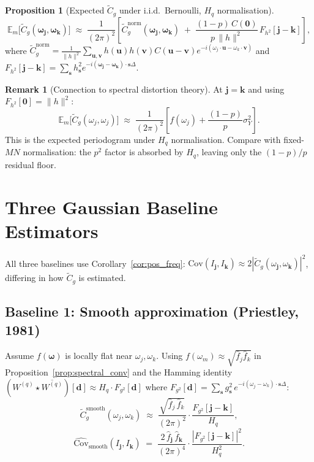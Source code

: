 \documentclass[12pt]{article}
\theoremstyle{definition}
\newtheorem{proposition}{Proposition}
\newtheorem{remark}{Remark}
\begin{document}
\begin{proposition}[Expected $\tilde{C}_g$ under i.i.d.\ Bernoulli, $H_q$ normalisation]
\label{prop:mask_bernoulli}
\[
\boxed{
  \mathbb{E}_m\!\bigl[\tilde{C}_g(\boldsymbol{\omega}_{\mathbf{j}},\boldsymbol{\omega}_{\mathbf{k}})\bigr]
  \;\approx\;
  \frac{1}{(2\pi)^2}\left[
    \tilde{C}_g^{\mathrm{norm}}(\boldsymbol{\omega}_{\mathbf{j}},\boldsymbol{\omega}_{\mathbf{k}})
  \;+\; \frac{(1-p)\,C(\mathbf{0})}{p\,\|h\|^2}\,F_{h^2}[\mathbf{j}-\mathbf{k}]
  \right],
}
\]
where $\tilde{C}_g^{\mathrm{norm}} = \frac{1}{\|h\|^2}\sum_{\mathbf{u},\mathbf{v}}h(\mathbf{u})h(\mathbf{v})C(\mathbf{u}-\mathbf{v})e^{-i(\omega_j \cdot \mathbf{u} - \omega_k \cdot \mathbf{v})}$
and $F_{h^2}[\mathbf{j}-\mathbf{k}] = \sum_{\mathbf{s}}h_{\mathbf{s}}^2 e^{-i(\boldsymbol{\omega}_{\mathbf{j}}-\boldsymbol{\omega}_{\mathbf{k}})\cdot\mathbf{s}\Delta}$.
\end{proposition}

\begin{remark}[Connection to spectral distortion theory]
At $\mathbf{j}=\mathbf{k}$ and using $F_{h^2}[\mathbf{0}]=\|h\|^2$:
\[
  \mathbb{E}_m\!\bigl[\tilde{C}_g(\omega_j,\omega_j)\bigr]
  \;\approx\;
  \frac{1}{(2\pi)^2}\!\left[f(\omega_j) + \frac{(1-p)}{p}\sigma^2_Y\right].
\]
This is the expected periodogram under $H_q$ normalisation.
Compare with fixed-$MN$ normalisation: the $p^2$ factor is absorbed by
$H_q$, leaving only the $(1-p)/p$ residual floor.
\end{remark}


\section{Three Gaussian Baseline Estimators}
\label{sec:baselines}

All three baselines use Corollary~\ref{cor:pos_freq}:
$\mathrm{Cov}(I_{\mathbf{j}},I_{\mathbf{k}}) \approx 2|\tilde{C}_g(\omega_{\mathbf{j}},\omega_{\mathbf{k}})|^2$,
differing in how $\tilde{C}_g$ is estimated.

\subsection{Baseline 1: Smooth approximation (Priestley, 1981)}

Assume $f(\boldsymbol{\omega})$ is locally flat near $\omega_j,\omega_k$.
Using $f(\omega_m)\approx\sqrt{\hat{f}_j\hat{f}_k}$ in
Proposition~\ref{prop:spectral_conv} and the Hamming identity
$(W^{(q)}\star\overline{W^{(q)}})[\mathbf{d}]\approx H_q\cdot F_{g^2}[\mathbf{d}]$
where $F_{g^2}[\mathbf{d}]=\sum_{\mathbf{s}}g_{\mathbf{s}}^2\,e^{-i(\omega_j-\omega_k)\cdot\mathbf{s}\Delta}$:
\[
  \tilde{C}_g^{\mathrm{smooth}}(\omega_j,\omega_k)
  \;\approx\; \frac{\sqrt{\hat{f}_j\,\hat{f}_k}}{(2\pi)^2}\cdot
    \frac{F_{g^2}[\mathbf{j}-\mathbf{k}]}{H_q},
\]
\[
\boxed{
  \widehat{\mathrm{Cov}}_{\mathrm{smooth}}(I_{\mathbf{j}},I_{\mathbf{k}})
  \;=\; \frac{2\,\hat{f}_{\mathbf{j}}\,\hat{f}_{\mathbf{k}}}{(2\pi)^4}\cdot
    \frac{|F_{g^2}[\mathbf{j}-\mathbf{k}]|^2}{H_q^2}.
}
\]
\end{document}
